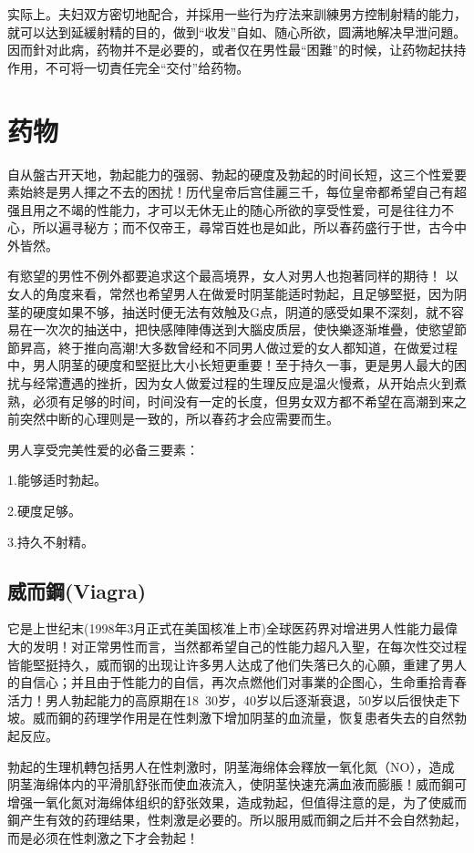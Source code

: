 \documentclass[12pt,UTF8]{ctexbook}
\begin{document}
实际上。夫妇双方密切地配合，并採用一些行为疗法来訓練男方控制射精的能力，就可以达到延緩射精的目的，做到“收发”自如、随心所欲，圆满地解决早泄问題。因而針对此病，药物并不是必要的，或者仅在男性最“困難”的时候，让药物起扶持作用，不可将一切責任完全“交付”给药物。

\chapter{药物}

自从盤古开天地，勃起能力的强弱、勃起的硬度及勃起的时间长短，这三个性爱要素始終是男人揮之不去的困扰！历代皇帝后宫佳麗三千，每位皇帝都希望自己有超强且用之不竭的性能力，才可以无休无止的随心所欲的享受性爱，可是往往力不心，所以遍寻秘方；而不仅帝王，尋常百姓也是如此，所以春药盛行于世，古今中外皆然。

有慾望的男性不例外都要追求这个最高境界，女人对男人也抱著同样的期待！
以女人的角度来看，常然也希望男人在做爱时阴茎能适时勃起，且足够堅挺，因为阴茎的硬度如果不够，抽送时便无法有效触及G点，阴道的感受如果不深刻，就不容易在一次次的抽送中，把快感陣陣傳送到大腦皮质层，使快樂逐渐堆疊，使慾望節節昇高，終于推向高潮!大多数曾经和不同男人做过爱的女人都知道，在做爱过程中，男人阴茎的硬度和堅挺比大小长短更重要！至于持久一事，更是男人最大的困扰与经常遭遇的挫折，因为女人做爱过程的生理反应是温火慢煮，从开始点火到煮熟，必须有足够的时间，时间没有一定的长度，但男女双方都不希望在高潮到来之前突然中断的心理则是一致的，所以春药才会应需要而生。

男人享受完美性爱的必备三要素：

1.能够适时勃起。

2.硬度足够。

3.持久不射精。

\section{威而鋼(Viagra)}

它是上世纪末(1998年3月正式在美国核准上市)全球医药界对增进男人性能力最偉大的发明！对正常男性而言，当然都希望自己的性能力超凡入聖，在每次性交过程皆能堅挺持久，威而钢的出现让许多男人达成了他们失落已久的心願，重建了男人的自信心；并且由于性能力的自信，再次点燃他们对事業的企图心，生命重拾青春活力！男人勃起能力的高原期在18~30岁，40岁以后逐渐衰退，50岁以后很快走下坡。威而鋼的药理学作用是在性刺激下增加阴茎的血流量，恢复患者失去的自然勃起反应。

勃起的生理机轉包括男人在性刺激时，阴茎海绵体会釋放一氧化氮（NO），造成阴茎海绵体内的平滑肌舒张而使血液流入，使阴茎快速充满血液而膨脹！威而鋼可增强一氧化氮对海绵体组织的舒张效果，造成勃起，但值得注意的是，为了使威而鋼产生有效的药理结果，性刺激是必要的。所以服用威而鋼之后并不会自然勃起，而是必须在性刺激之下才会勃起！
\end{document}
